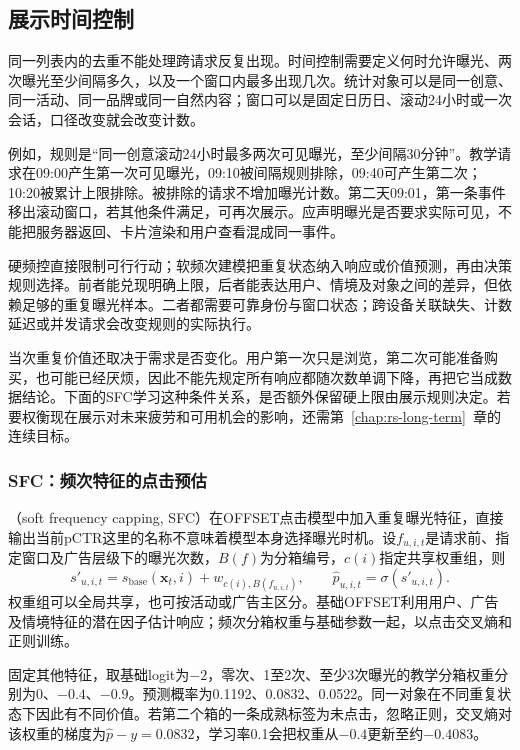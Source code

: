 \subsection{展示时间控制}
\label{sec:rs-presentation-time}

同一列表内的去重不能处理跨请求反复出现。时间控制需要定义何时允许曝光、两次曝光至少间隔多久，以及一个窗口内最多出现几次。统计对象可以是同一创意、同一活动、同一品牌或同一自然内容；窗口可以是固定日历日、滚动24小时或一次会话，口径改变就会改变计数。

例如，规则是“同一创意滚动24小时最多两次可见曝光，至少间隔30分钟”。教学请求在09:00产生第一次可见曝光，09:10被间隔规则排除，09:40可产生第二次；10:20被累计上限排除。被排除的请求不增加曝光计数。第二天09:01，第一条事件移出滚动窗口，若其他条件满足，可再次展示。应声明曝光是否要求实际可见，不能把服务器返回、卡片渲染和用户查看混成同一事件。

硬频控直接限制可行行动；软频次建模把重复状态纳入响应或价值预测，再由决策规则选择。前者能兑现明确上限，后者能表达用户、情境及对象之间的差异，但依赖足够的重复曝光样本。二者都需要可靠身份与窗口状态；跨设备关联缺失、计数延迟或并发请求会改变规则的实际执行。

当次重复价值还取决于需求是否变化。用户第一次只是浏览，第二次可能准备购买，也可能已经厌烦，因此不能先规定所有响应都随次数单调下降，再把它当成数据结论。下面的SFC学习这种条件关系，是否额外保留硬上限由展示规则决定。若要权衡现在展示对未来疲劳和可用机会的影响，还需第~\ref{chap:rs-long-term}~章的连续目标。

\Needspace{90mm}
\subsubsection{SFC：频次特征的点击预估}
\label{sec:rs-sfc}

（soft frequency capping, SFC）在OFFSET点击模型中加入重复曝光特征，直接输出当前pCTR这里的名称不意味着模型本身选择曝光时机。设$f_{u,i,t}$是请求前、指定窗口及广告层级下的曝光次数，$B(f)$为分箱编号，$c(i)$指定共享权重组，则
\begin{equation}
 s'_{u,i,t}=s_{\mathrm{base}}(\bm x_t,i)+w_{c(i),B(f_{u,i,t})},
 \qquad
 \widehat p_{u,i,t}=\sigma(s'_{u,i,t}).
 \label{eq:rs-sfc}
\end{equation}
权重组可以全局共享，也可按活动或广告主区分。基础OFFSET利用用户、广告及情境特征的潜在因子估计响应；频次分箱权重与基础参数一起，以点击交叉熵和正则训练。

固定其他特征，取基础logit为$-2$，零次、1至2次、至少3次曝光的教学分箱权重分别为0、$-0.4$、$-0.9$。预测概率为0.1192、0.0832、0.0522。同一对象在不同重复状态下因此有不同价值。若第二个箱的一条成熟标签为未点击，忽略正则，交叉熵对该权重的梯度为$\widehat p-y=0.0832$，学习率0.1会把权重从$-0.4$更新至约$-0.4083$。

